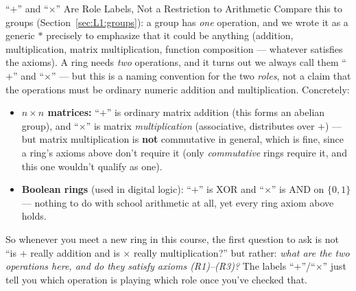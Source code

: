 \begin{rmkbox}{``$+$'' and ``$\times$'' Are Role Labels, Not a Restriction to Arithmetic}
Compare this to groups (Section~\ref{sec:L1:groups}): a group has \emph{one} operation, and we wrote it as a generic $*$ precisely to emphasize that it could be anything (addition, multiplication, matrix multiplication, function composition --- whatever satisfies the axioms). A ring needs \emph{two} operations, and it turns out we always call them ``$+$'' and ``$\times$'' --- but this is a naming convention for the two \emph{roles}, not a claim that the operations must be ordinary numeric addition and multiplication. Concretely:
\begin{itemize}[leftmargin=*]
  \item \textbf{$n \times n$ matrices:} ``$+$'' is ordinary matrix addition (this forms an abelian group), and ``$\times$'' is matrix \emph{multiplication} (associative, distributes over $+$) --- but matrix multiplication is \textbf{not} commutative in general, which is fine, since a ring's axioms above don't require it (only \emph{commutative} rings require it, and this one wouldn't qualify as one).
  \item \textbf{Boolean rings} (used in digital logic): ``$+$'' is XOR and ``$\times$'' is AND on $\{0,1\}$ --- nothing to do with school arithmetic at all, yet every ring axiom above holds.
\end{itemize}
So whenever you meet a new ring in this course, the first question to ask is not ``is $+$ really addition and is $\times$ really multiplication?'' but rather: \emph{what are the two operations here, and do they satisfy axioms (R1)--(R3)?} The labels ``$+$''/``$\times$'' just tell you which operation is playing which role once you've checked that.
\end{rmkbox}

